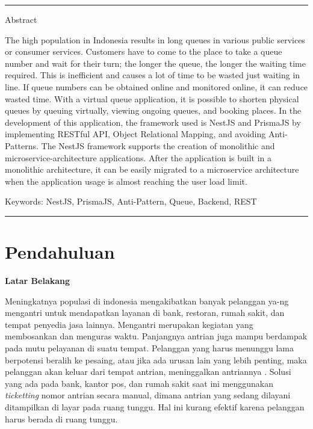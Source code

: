 


\noindent\rule{\textwidth}{1pt}
Abstract

The high population in Indonesia results in long queues in various public services or consumer services. Customers have to come to the place to take a queue number and wait for their turn; the longer the queue, the longer the waiting time required. This is inefficient and causes a lot of time to be wasted just waiting in line. If queue numbers can be obtained online and monitored online, it can reduce wasted time. With a virtual queue application, it is possible to shorten physical queues by queuing virtually, viewing ongoing queues, and booking places. In the development of this application, the framework used is NestJS and PrismaJS by implementing RESTful API, Object Relational Mapping, and avoiding Anti-Patterns. The NestJS framework supports the creation of monolithic and microservice-architecture applications. After the application is built in a monolithic architecture, it can be easily migrated to a microservice architecture when the application usage is almost reaching the user load limit.

 \bigskip
 Keywords: NestJS, PrismaJS, Anti-Pattern, Queue, Backend, REST

\noindent\rule{\textwidth}{1pt}



\section{Pendahuluan}

\noindent\textbf{Latar Belakang}

Meningkatnya populasi di indonesia mengakibatkan banyak pelanggan ya-ng mengantri untuk mendapatkan layanan di bank, restoran, rumah sakit, dan tempat penyedia jasa lainnya. Mengantri merupakan kegiatan yang membosankan dan menguras waktu. Panjangnya antrian juga mampu berdampak pada mutu pelayanan di suatu tempat. Pelanggan yang harus menunggu lama berpotensi beralih ke pesaing, atau jika ada urusan lain yang lebih penting, maka pelanggan akan keluar dari tempat antrian, meninggalkan antriannya \cite{khong2017queue}\cite{Ghazal2016}\cite{Uddin2016}. Solusi yang ada pada bank, kantor pos, dan rumah sakit saat ini menggunakan \textit{ticketting} nomor antrian secara manual, dimana antrian yang sedang dilayani ditampilkan di layar pada ruang tunggu. Hal ini kurang efektif karena pelanggan harus berada di ruang tunggu\cite{Ghazal2016}.


